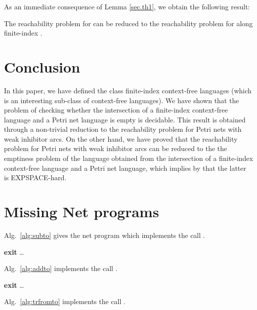 \documentclass{fsttcs}
\begin{document}
As an immediate consequence of Lemma \ref{sec.th1}, we obtain the following
result:

\begin{corollary}
The reachability problem for  can be reduced to the reachability problem for
 along finite-index . 
\end{corollary}
 

\section{Conclusion}
In this paper, we have defined  the class finite-index context-free languages  (which is an interesting sub-class of  context-free languages). We have shown that  the problem of checking whether the intersection of a finite-index context-free language and a Petri net language is empty is decidable. This result is obtained through a non-trivial reduction to  the reachability problem for Petri nets with weak inhibitor arcs. On the other hand, we have proved that the reachability problem for Petri nets with weak inhibitor arcs  can be reduced to the the emptiness problem of the language obtained from the intersection of a finite-index context-free language and a Petri net language, which implies by \cite{Lipton} that the latter is EXPSPACE-hard.



\begin{spacing}{0.9}


\end{spacing}



\newpage
\appendix


\section{Missing Net programs}
Alg.~\ref{alg:subto} gives the net program which implements the call .

\begin{algorithm}[H]
	\nlset{}\goto \textbf{exit} \Kor  \Kor \ldots \Kor  \;
	\nlset{:}\;
	\;
	\goto \textbf{}\;
	[\ldots]\;
	\nlset{:}\;
	\;
	\goto \;
	 \Return{}\;
	\caption{\label{alg:subto}}
\end{algorithm}
Alg.~\ref{alg:addto} implements the call .

\begin{algorithm}[H]
\nlset{}\goto \textbf{exit} \Kor  \Kor \ldots \Kor  \;
	\nlset{:}\;
	\;
	\goto \;
	[\ldots]\;
	\nlset{:}\;
	\;
	\goto \;
	 \Return{}\;
	\caption{\label{alg:addto}}
\end{algorithm}
Alg.~\ref{alg:trfromto} implements the call .
\end{document}
